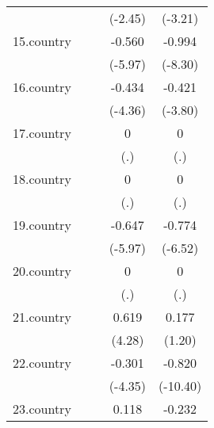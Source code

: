 {\begin{tabular}{l*{4}{c}}
            &                     &                     &     (-2.45)         &     (-3.21)         \\
[1em]
15.country  &                     &                     &      -0.560\sym{***}&      -0.994\sym{***}\\
            &                     &                     &     (-5.97)         &     (-8.30)         \\
[1em]
16.country  &                     &                     &      -0.434\sym{***}&      -0.421\sym{***}\\
            &                     &                     &     (-4.36)         &     (-3.80)         \\
[1em]
17.country  &                     &                     &           0         &           0         \\
            &                     &                     &         (.)         &         (.)         \\
[1em]
18.country  &                     &                     &           0         &           0         \\
            &                     &                     &         (.)         &         (.)         \\
[1em]
19.country  &                     &                     &      -0.647\sym{***}&      -0.774\sym{***}\\
            &                     &                     &     (-5.97)         &     (-6.52)         \\
[1em]
20.country  &                     &                     &           0         &           0         \\
            &                     &                     &         (.)         &         (.)         \\
[1em]
21.country  &                     &                     &       0.619\sym{***}&       0.177         \\
            &                     &                     &      (4.28)         &      (1.20)         \\
[1em]
22.country  &                     &                     &      -0.301\sym{***}&      -0.820\sym{***}\\
            &                     &                     &     (-4.35)         &    (-10.40)         \\
[1em]
23.country  &                     &                     &       0.118         &      -0.232\sym{*}  \\

\end{tabular}}
